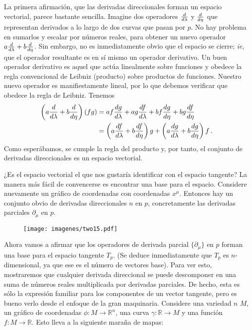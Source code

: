 \documentclass[11pt,b5paper,openany,twoside]{book}
\newcommand{\p}[1]{{\partial_{#1}}}
\newcommand{\R}{\mathbb{R}}
\begin{document}
La primera afirmación, que las derivadas direccionales forman un espacio vectorial, parece bastante sencilla.
Imagine dos operadores ${d\over{d\lambda}}$ y ${d\over{d\eta}}$ que representan derivados a lo largo de dos curvas que pasan por $p$.
No hay problema en sumarlos y escalar por números reales, para obtener un nuevo operador $a{d\over{d\lambda}}+ b{d\over{d\eta}}$.
Sin embargo, no es inmediatamente obvio que el espacio se cierre; {\it ie}, que el operador resultante es en sí mismo un operador derivativo.
Un buen operador derivativo es aquel que actúa linealmente sobre funciones y obedece la regla convencional de Leibniz (producto) sobre productos de funciones.
Nuestro nuevo operador es manifiestamente lineal, por lo que debemos verificar que obedece la regla de Leibniz.
Tenemos
\begin{align}
\left(a{d\over{d\lambda}}+ b{d\over{d\eta}}\right)(fg)
&= af{{dg}\over{d\lambda}} + ag{{df}\over{d\lambda}} +
bf{{dg}\over{d\eta}} + bg{{df}\over{d\eta}} \nonumber \\
&= \left(a{{df}\over{d\lambda}}+ b{{df}\over{d\eta}}\right)g +
\left(a{{dg}\over{d\lambda}}+ b{{dg}\over{d\eta}}\right)f\,.
\label{2.8}
\end{align}
Como esperábamos, se cumple la regla del producto y, por tanto, el conjunto de derivadas direccionales es un espacio vectorial.

¿Es el espacio vectorial el que nos gustaría identificar con el espacio tangente? La manera más fácil de convencerse es encontrar una base para el espacio.
Considere nuevamente un gráfico de coordenadas con coordenadas $x^\mu$.
Entonces hay un conjunto obvio de derivadas direccionales $n$ en $p$, concretamente las derivadas parciales $\p\mu$ en $p$.

\begin{figure}[h]
\centering
\texttt{[image: imagenes/two15.pdf]}
\end{figure}

\noindent
Ahora vamos a afirmar que los operadores de derivada parcial $\{\p\mu\}$ en $p$ forman una base para el espacio tangente $T_p$.
(Se deduce inmediatamente que $T_p$ es $n$-dimensional, ya que ese es el número de vectores base).
Para ver esto, mostraremos que cualquier derivada direccional se puede descomponer en una suma de números reales multiplicada por derivadas parciales.
De hecho, esta es sólo la expresión familiar para los componentes de un vector tangente, pero es bueno verlo desde el enfoque de la gran maquinaria.
Considere una variedad $n$ $M$, un gráfico de coordenadas $\phi:M\rightarrow \R^n$, una curva $\gamma:\R\rightarrow M$ y una función $f:M\rightarrow\R$.
Esto lleva a la siguiente maraña de mapas:
\end{document}
